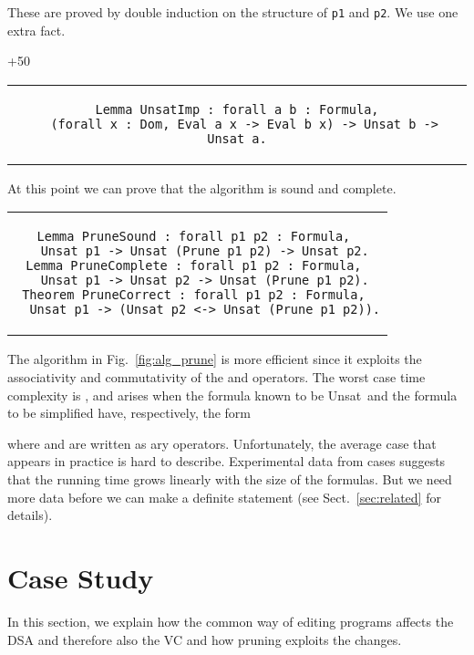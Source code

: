 \documentclass{llncs}
\def\lstinlinen{\lstinline[basicstyle=\normalsize\sffamily]}
\def\unsat{{\sc Unsat}}
\begin{document}
\noindent
These are proved by double induction on the structure of 
\lstinlinen|p1| and \lstinlinen|p2|. We use one extra 
fact.

\penalty+50

\begin{tabular}{c}
\begin{lstlisting}
Lemma UnsatImp : forall a b : Formula,
  (forall x : Dom, Eval a x -> Eval b x) -> Unsat b -> Unsat a.
\end{lstlisting}
\end{tabular}

\noindent
At this point we can prove that the algorithm 
is sound and complete.

\begin{tabular}{c}
\begin{lstlisting}
Lemma PruneSound : forall p1 p2 : Formula, 
  Unsat p1 -> Unsat (Prune p1 p2) -> Unsat p2.
Lemma PruneComplete : forall p1 p2 : Formula, 
  Unsat p1 -> Unsat p2 -> Unsat (Prune p1 p2).
Theorem PruneCorrect : forall p1 p2 : Formula, 
  Unsat p1 -> (Unsat p2 <-> Unsat (Prune p1 p2)).
\end{lstlisting}
\end{tabular}

The algorithm in Fig.~\ref{fig:alg_prune} is more efficient
since it exploits the associativity and commutativity of the 
 and  operators. The worst case time complexity 
is , and arises when the formula known to be \unsat\
and the formula to be simplified have, respectively, the form



\noindent
where  and  are written as ary operators.
Unfortunately, the average case that
appears in practice is hard to describe. Experimental data
from  cases suggests that the running time grows linearly
with the size of the formulas. But we need more data before 
we can make a definite statement 
(see Sect.~\ref{sec:related} for details).

\section{Case Study}

In this section, we explain how the common way of editing programs
affects the DSA and therefore also the VC and how pruning exploits
the changes.
\end{document}
